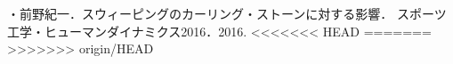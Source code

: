\documentclass[main]{subfiles}
\begin{document}
{}

・前野紀一．スウィーピングのカーリング・ストーンに対する影響．
スポーツ工学・ヒューマンダイナミクス2016．2016.
<<<<<<< HEAD
=======
>>>>>>> origin/HEAD
\printbibliography[title=参考文献]
\end{document}
